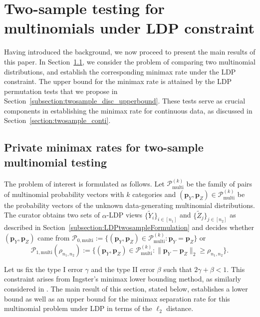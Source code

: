 \documentclass[twoside,11pt]{article}
\newcommand{\distClassGeneric}{\mathcal{P}}
\newcommand{\distclassMultinomial}{\distClassGeneric_{\mathrm{multi}}^{(\alphabetSize)}}
\newcommand{\rhoTwosample}{\rho_{\sampleSize_1, \sampleSize_2}}
\newcommand{\rvTwo}{Y}
\newcommand{\rvThree}{Z}
\newcommand{\rvY}{Y}
\newcommand{\rvYPriv}{\tilde{\rvY}} %
\newcommand{\rvZ}{Z}
\newcommand{\rvZPriv}{\tilde{\rvZ}} %
\newcommand{\sampleIndexOne}{i}
\newcommand{\sampleIndexTwo}{j}
\newcommand{\sampleSets}[3]{\{{#1}_{#2}\}_{#2 \in [#3]}}
\newcommand{\alphabetSize}{k} %
\newcommand{\sampleSize}{n}
\newcommand{\probVec}{\mathbf{p}} %
\newcommand{\privacyParameter}{\alpha} %
\newcommand{\maxErrorTypeTwo}{\beta} %
\newcommand{\maxErrorTypeOne}{\gamma} %
\begin{document}
\section{Two-sample testing for multinomials under LDP constraint}\label{section:twosample_disc}  
Having introduced the background, we now proceed to present the main results of this paper. In Section~\ref{subsection:twosample_multinomial_rates}, we consider the problem of comparing two multinomial distributions, and establish the corresponding minimax rate under the LDP constraint. The upper bound for the minimax rate is attained by the LDP permutation tests that we propose in Section~\ref{subsection:twosample_disc_upperbound}. These tests serve as crucial components in establishing the minimax rate for continuous data, as discussed in Section~\ref{section:twosample_conti}.

\subsection{Private minimax rates for two-sample multinomial testing}\label{subsection:twosample_multinomial_rates}
The problem of interest is formulated as follows. Let $\distclassMultinomial$ be the family of pairs of multinomial probability vectors with $\alphabetSize$ categories and $(\probVec_\rvY , \probVec_\rvZ) \in \distclassMultinomial$ be the probability vectors of the unknown data-generating multinomial distributions. The curator obtains two sets of $\privacyParameter$-LDP views $\sampleSets{\rvYPriv}{\sampleIndexOne}{\sampleSize_1}$ and $\sampleSets{\rvZPriv}{\sampleIndexTwo}{\sampleSize_2}$ as described in Section~\ref{subsection:LDPtwosampleFormulation}
and decides whether $(\probVec_Y , \probVec_Z)$ came from $\distClassGeneric_{0,\mathrm{multi}} := \{ (\probVec_\rvY , \probVec_\rvZ) \in \distclassMultinomial: \probVec_\rvY = \probVec_\rvZ \}$ or
\begin{equation}\label{eq:settingTwosampleDisc}
	\mathcal{P}_{1,\mathrm{multi}}(\rho_{n_1,n_2})
	:=
	\bigl\{
	(\probVec_\rvY , \probVec_\rvZ) \in \distclassMultinomial:
	\| \probVec_\rvTwo - \probVec_\rvThree \|_2 \geq \rhoTwosample
	\bigr\}.   
\end{equation}

Let us fix the type I error $\maxErrorTypeOne$ and the type II error $\maxErrorTypeTwo$ such that $2\maxErrorTypeOne + \maxErrorTypeTwo < 1$. This constraint arises from Ingster's minimax lower bounding method, as similarly considered in \cite{Lam-Weil2021MinimaxConstraint}. The main result of this section, stated below, establishes a lower bound as well as an upper bound for the minimax separation rate for this multinomial problem under LDP in terms of the $\ell_2$ distance.
\end{document}
